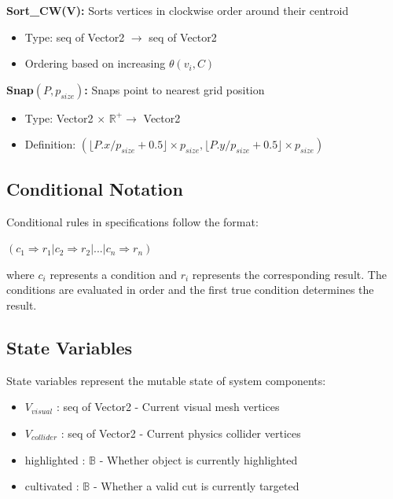 \documentclass[12pt, titlepage]{article}
\begin{document}
\vspace{5mm}

\textbf{Sort\_CW(V):} Sorts vertices in clockwise order around their centroid
\begin{itemize}
\item Type: seq of Vector2 $\rightarrow$ seq of Vector2
\item Ordering based on increasing $\theta(v_i, C)$
\end{itemize}

\vspace{5mm}

\textbf{Snap$(P, p_{size})$:} Snaps point to nearest grid position
\begin{itemize}
\item Type: Vector2 $\times$ $\mathbb{R}^+ \rightarrow$ Vector2
\item Definition: $(\lfloor P.x/p_{size} + 0.5 \rfloor \times p_{size}, \lfloor P.y/p_{size} + 0.5 \rfloor \times p_{size})$
\end{itemize}

\subsection{Conditional Notation}

Conditional rules in specifications follow the format:

$(c_1 \Rightarrow r_1 | c_2 \Rightarrow r_2 | ... | c_n \Rightarrow r_n)$

where $c_i$ represents a condition and $r_i$ represents the corresponding result. The conditions are evaluated in order and the first true condition determines the result.

\subsection{State Variables}

State variables represent the mutable state of system components:
\begin{itemize}
\item $V_{visual}$ : seq of Vector2 - Current visual mesh vertices
\item $V_{collider}$ : seq of Vector2 - Current physics collider vertices
\item highlighted : $\mathbb{B}$ - Whether object is currently highlighted
\item cultivated : $\mathbb{B}$ - Whether a valid cut is currently targeted
\end{itemize}
\end{document}
